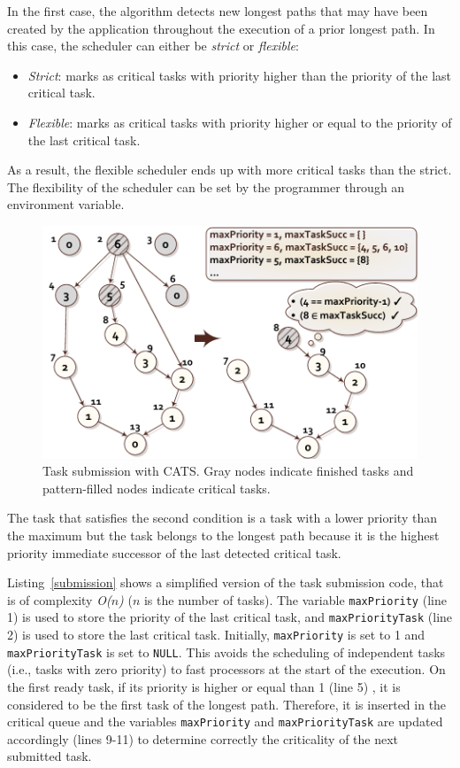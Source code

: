 In the first case, the algorithm detects new longest paths that may have been created by the application throughout the execution of a prior longest path. In this case, the scheduler can either be \textit{strict} or \textit{flexible}:
\begin{itemize}
 \item{\textit{Strict}: marks as critical tasks with priority higher than the priority of the last critical task.}
 \item{\textit{Flexible}: marks as critical tasks with priority higher or equal to the priority of the last critical task.} 
 \end{itemize}
As a result, the flexible scheduler ends up with more critical tasks than the strict. The flexibility of the scheduler can be set by the programmer through an environment variable.
\begin{figure}[tl!]
\includegraphics[width=\columnwidth]{figures/fig2.pdf} 
\centering
\caption{Task submission with CATS. Gray nodes indicate finished tasks and pattern-filled nodes indicate critical tasks.}
\label{submitFig}
\vspace{-0.5cm}
\end{figure}
The task that satisfies the second condition is a task with a lower priority than the maximum but the task belongs to the longest path because it is the highest priority immediate successor of the last detected critical task. 

Listing~\ref{submission} shows a simplified version of the task submission code, that is of complexity \textit{O($n$)} (\textit{$n$} is the number of tasks). The variable \texttt{maxPriority} (line 1) is used to store the priority of the last critical task, and \texttt{maxPriorityTask} (line 2) is used to store the last critical task. Initially, \texttt{maxPriority} is set to 1 and \texttt{maxPriorityTask} is set to \texttt{NULL}. This avoids the scheduling of independent tasks (i.e., tasks with zero priority) to fast processors at the start of the execution. On the first ready task, if its priority is higher or equal than 1 (line 5) , it is considered to be the first task of the longest path. Therefore, it is inserted in the critical queue and the variables \texttt{maxPriority} and \texttt{maxPriorityTask} are updated accordingly (lines 9-11) to determine correctly the criticality of the next submitted task.

